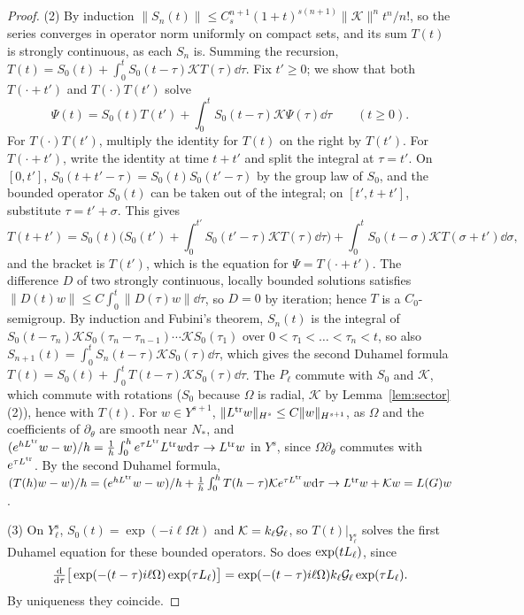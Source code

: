 \begin{proof}
(2) By induction $\|S_n(t)\|\le C_s^{n+1}(1+t)^{s(n+1)}\|\mathcal K\|^nt^n/n!$, so the
series converges in operator norm uniformly on compact sets, and its sum $T(t)$ is
strongly continuous, as each $S_n$ is. Summing the recursion,
$T(t)=S_0(t)+\int_0^tS_0(t-\tau)\mathcal KT(\tau)\dd\tau$. Fix $t'\ge0$; we show
that both $T(\cdot+t')$ and $T(\cdot)T(t')$ solve
\[
\Psi(t)=S_0(t)T(t')+\int_0^tS_0(t-\tau)\mathcal K\Psi(\tau)\dd\tau\qquad(t\ge0).
\]
For $T(\cdot)T(t')$, multiply the identity for $T(t)$ on the right by $T(t')$. For
$T(\cdot+t')$, write the identity at time $t+t'$ and split the integral at $\tau=t'$.
On $[0,t']$, $S_0(t+t'-\tau)=S_0(t)S_0(t'-\tau)$ by the group law of $S_0$, and the
bounded operator $S_0(t)$ can be taken out of the integral; on $[t',t+t']$,
substitute $\tau=t'+\sigma$. This gives
\[
T(t+t')=S_0(t)\Big(S_0(t')+\int_0^{t'}S_0(t'-\tau)\mathcal KT(\tau)\dd\tau\Big)
+\int_0^tS_0(t-\sigma)\mathcal KT(\sigma+t')\dd\sigma ,
\]
and the bracket is $T(t')$, which is the equation for $\Psi=T(\cdot+t')$. The difference
$D$ of two strongly continuous, locally bounded solutions satisfies
$\|D(t)w\|\le C\int_0^t\|D(\tau)w\|\dd\tau$, so $D=0$ by iteration; hence $T$ is a
$C_0$-semigroup. By induction and Fubini's theorem, $S_n(t)$ is the integral of
$S_0(t-\tau_n)\mathcal KS_0(\tau_n-\tau_{n-1})\cdots\mathcal KS_0(\tau_1)$ over
$0<\tau_1<\dots<\tau_n<t$, so also $S_{n+1}(t)=\int_0^tS_n(t-\tau)\mathcal KS_0(\tau)\dd\tau$,
which gives the second Duhamel formula
$T(t)=S_0(t)+\int_0^tT(t-\tau)\mathcal KS_0(\tau)\dd\tau$. The $P_\ell$ commute with
$S_0$ and $\mathcal K$, which commute with rotations ($S_0$ because $\Omega$ is
radial, $\mathcal K$ by Lemma~\ref{lem:sector}(2)), hence with $T(t)$. For
$w\in Y^{s+1}$, $\|L^{\rm tr}w\|_{H^s}\le C\|w\|_{H^{s+1}}$, as $\Omega$ and the
coefficients of $\partial_\theta$ are smooth near $N_*$, and
$(e^{hL^{\rm tr}}w-w)/h=\frac1h\int_0^he^{\tau L^{\rm tr}}L^{\rm tr}w\dd\tau\to L^{\rm tr}w$
in $Y^s$, since $\Omega\partial_\theta$ commutes with $e^{\tau L^{\rm tr}}$. By the
second Duhamel formula,
$(T(h)w-w)/h=(e^{hL^{\rm tr}}w-w)/h+\frac1h\int_0^hT(h-\tau)\mathcal Ke^{\tau L^{\rm tr}}w\dd\tau
\to L^{\rm tr}w+\mathcal Kw=L(G)w$.

(3) On $Y^s_\ell$, $S_0(t)=\exp(-i\ell\Omega t)$ and $\mathcal K=k_\ell\mathcal{G}_\ell$,
so $T(t)|_{Y^s_\ell}$ solves the first Duhamel equation for these bounded
operators. So does $\exp(tL_{\ell})$, since
\[
\tfrac{\dd}{\dd\tau}\big[\exp(-(t-\tau)i\ell\Omega)\exp(\tau L_{\ell})\big]
=\exp(-(t-\tau)i\ell\Omega)k_\ell\mathcal{G}_\ell\exp(\tau L_{\ell}).
\]
By uniqueness they coincide.
\end{proof}

